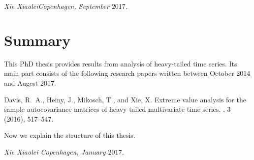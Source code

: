 {\em Xie Xiaolei\qquad \qquad \qquad \qquad \qquad Copenhagen, September $2017$.}


\chapter*{Summary}
This PhD thesis provides results from analysis of heavy-tailed time
series. Its main part consists of the following research papers
written between October $2014$ and Augest $2017$.


\begin{enumerate}
{\sc Davis, R.~A., Heiny, J., Mikosch, T., and Xie, X.}
\newblock Extreme value analysis for the sample autocovariance matrices of
  heavy-tailed multivariate time series.
, 3 (2016), 517--547. \href{http://link.springer.com/article/10.1007/s10687-016-0251-7}{\blue{[pdf]}}
\end{enumerate}

Now we explain the structure of this thesis.

{\em Xie Xiaolei \qquad \qquad \qquad \qquad \qquad Copenhagen, January $2017$.}

\newpage
\tableofcontents

\mainmatter

\def\phdthesis{1}






% 


\newpage
\leavevmode\thispagestyle{empty}
\phantom{bla}









